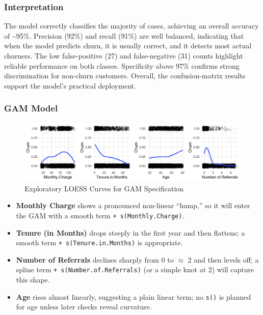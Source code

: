 \documentclass[
]{article}
\providecommand{\tightlist}{%
  \setlength{\itemsep}{0pt}\setlength{\parskip}{0pt}}
\begin{document}
\hypertarget{interpretation}{%
\subsubsection{Interpretation}\label{interpretation}}

The model correctly classifies the majority of cases, achieving an
overall accuracy of \textasciitilde95\%. Precision (92\%) and recall
(91\%) are well balanced, indicating that when the model predicts churn,
it is usually correct, and it detects most actual churners. The low
false-positive (27) and false-negative (31) counts highlight reliable
performance on both classes. Specificity above 97\% confirms strong
discrimination for non-churn customers. Overall, the confusion-matrix
results support the model's practical deployment.

\hypertarget{gam-model}{%
\subsubsection{GAM Model}\label{gam-model}}

\begin{figure}

{\centering \includegraphics[width=0.95\linewidth]{glm_gam_plots/Curve analysis} 

}

\caption{Exploratory LOESS Curves for GAM Specification}\label{fig:loess-gam-img}
\end{figure}

\begin{itemize}
\tightlist
\item
  \textbf{Monthly Charge} shows a pronounced non-linear ``hump,'' so it
  will enter the GAM with a smooth term \texttt{+\ s(Monthly.Charge)}.\\
\item
  \textbf{Tenure (in Months)} drops steeply in the first year and then
  flattens; a smooth term \texttt{+\ s(Tenure.in.Months)} is
  appropriate.\\
\item
  \textbf{Number of Referrals} declines sharply from 0 to \(\approx\) 2
  and then levels off; a spline term \texttt{+\ s(Number.of.Referrals)}
  (or a simple knot at 2) will capture this shape.\\
\item
  \textbf{Age} rises almost linearly, suggesting a plain linear term; no
  \texttt{s()} is planned for age unless later checks reveal curvature.
\end{itemize}
\end{document}
